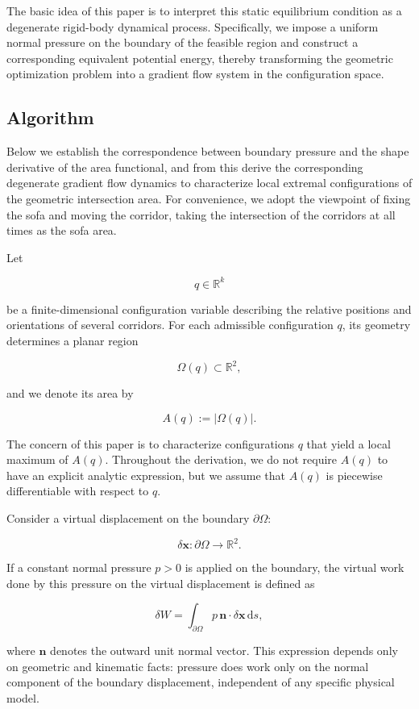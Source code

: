 \documentclass[12pt,a4paper]{article}
\theoremstyle{remark} %
\begin{document}
The basic idea of this paper is to interpret this static equilibrium condition as a degenerate rigid-body dynamical process. Specifically, we impose a uniform normal pressure on the boundary of the feasible region and construct a corresponding equivalent potential energy, thereby transforming the geometric optimization problem into a gradient flow system in the configuration space.

\subsection{Algorithm}

Below we establish the correspondence between boundary pressure and the shape derivative of the area functional, and from this derive the corresponding degenerate gradient flow dynamics to characterize local extremal configurations of the geometric intersection area. For convenience, we adopt the viewpoint of fixing the sofa and moving the corridor, taking the intersection of the corridors at all times as the sofa area.

Let

\[
q \in \mathbb{R}^k
\]

be a finite-dimensional configuration variable describing the relative positions and orientations of several corridors. For each admissible configuration $q$, its geometry determines a planar region

\[
\Omega(q) \subset \mathbb{R}^2 ,
\]

and we denote its area by

\[
A(q) := |\Omega(q)| .
\]

The concern of this paper is to characterize configurations $q$ that yield a local maximum of $A(q)$. Throughout the derivation, we do not require $A(q)$ to have an explicit analytic expression, but we assume that $A(q)$ is piecewise differentiable with respect to $q$.

Consider a virtual displacement on the boundary $\partial \Omega$:

\[
\delta \mathbf{x} : \partial \Omega \to \mathbb{R}^2 .
\]

If a constant normal pressure $p>0$ is applied on the boundary, the virtual work done by this pressure on the virtual displacement is defined as

\[
\delta W
=
\int_{\partial \Omega}
p \, \mathbf{n} \cdot \delta \mathbf{x} \, \mathrm{d}s ,
\tag{1}
\]

where $\mathbf{n}$ denotes the outward unit normal vector. This expression depends only on geometric and kinematic facts: pressure does work only on the normal component of the boundary displacement, independent of any specific physical model.
\end{document}
